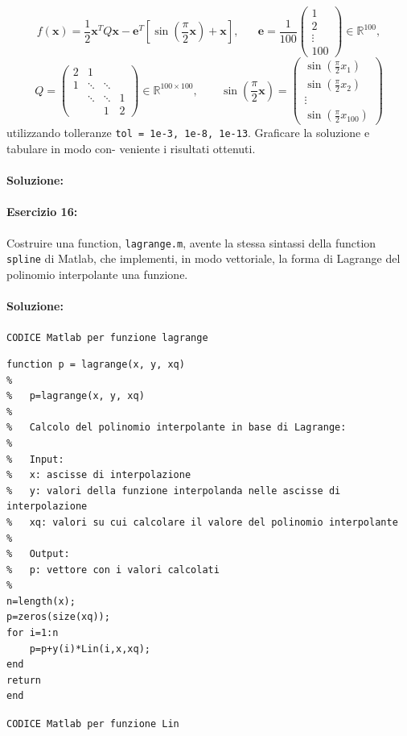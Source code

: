 \documentclass[12pt]{article}
\begin{document}
\begin{equation*} 
    f(\boldsymbol{x})=\frac{1}{2}\boldsymbol{x}^TQ\boldsymbol{x}-\boldsymbol{e}^T\left[ \sin(\frac{\pi}{2}\boldsymbol{x})+\boldsymbol{x}\right],\;\;\;\;\;\;
    \boldsymbol{e}=\frac{1}{100}
    \begin{pmatrix}
        1\\
        2\\
        \vdots \\
        100
    \end{pmatrix}
    \in \mathbb{R}^{100},
\end{equation*}
\begin{equation*}
    Q=
    \begin{pmatrix}
        2 & 1 &  & \\
        1 & \ddots &\ddots& \\
        &\ddots &\ddots &1 \\
        & &  1&2
    \end{pmatrix}
    \in \mathbb{R}^{100\times 100}, \;\;\;\;\;\;\;\sin(\frac{\pi}{2}\boldsymbol{x}) =
    \begin{pmatrix}
        \sin(\frac{\pi}{2}x_1)\\
        \sin(\frac{\pi}{2}x_2)\\
        \vdots \\
        \sin(\frac{\pi}{2}x_{100})
    \end{pmatrix}
\end{equation*}
utilizzando tolleranze \texttt{tol = 1e-3, 1e-8, 1e-13}. Graficare la soluzione e tabulare in modo con- veniente i risultati ottenuti.
\paragraph{Soluzione:}



\paragraph{Esercizio 16:}
Costruire una function, \texttt{lagrange.m}, avente la stessa sintassi della function \texttt{spline}
di Matlab, che implementi, in modo vettoriale, la forma di Lagrange del polinomio interpolante una
funzione.

\paragraph{Soluzione:}

\texttt{CODICE Matlab per funzione lagrange}
\begin{lstlisting}[frame=single]
function p = lagrange(x, y, xq)
%
%   p=lagrange(x, y, xq)
%
%   Calcolo del polinomio interpolante in base di Lagrange:
%
%   Input:
%   x: ascisse di interpolazione
%   y: valori della funzione interpolanda nelle ascisse di interpolazione
%   xq: valori su cui calcolare il valore del polinomio interpolante
%
%   Output:
%   p: vettore con i valori calcolati
%
n=length(x);
p=zeros(size(xq));
for i=1:n
    p=p+y(i)*Lin(i,x,xq);
end
return
end
\end{lstlisting}
\newpage
\texttt{CODICE Matlab per funzione Lin}
\end{document}
